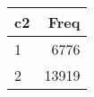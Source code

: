 
\begin{tabular}[t]{lr}
\toprule
c2 & Freq\\
\midrule
1 & 6776\\
2 & 13919\\
\bottomrule
\end{tabular}